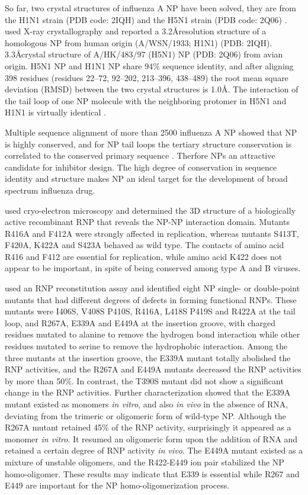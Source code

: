 So far, two crystal structures of influenza A NP have been solved, they are from the H1N1 strain (PDB code: 2IQH) \citep{1140} and the H5N1 strain (PDB code: 2Q06) \citep{1231}. \citep{1140} used X-ray crystallography and reported a 3.2\AA resolution structure of a homologous NP from human origin (A/WSN/1933; H1N1) (PDB: 2IQH). \citep{1231} 3.3\AA crystal structure of A/HK/483/97 (H5N1) NP (PDB: 2Q06) from avian origin. H5N1 NP and H1N1 NP share 94\% sequence identity, and after aligning 398 residues (residues 22–72, 92–202, 213–396, 438–489) the root mean square deviation (RMSD) between the two crystal structures is 1.0\AA \citep{1140}. The interaction of the tail loop of one NP molecule with the neighboring protomer in H5N1 and H1N1 is virtually identical \citep{1140}.

Multiple sequence alignment of more than 2500 influenza A NP showed that NP is highly conserved, and for NP tail loops the tertiary structure conservation is correlated to the conserved primary sequence \citep{1517}. Therfore NPs an attractive candidate for inhibitor design. The high degree of conservation in sequence identity and structure makes NP an ideal target for the development of broad spectrum influenza drug.%

\citep{1447} used cryo-electron microscopy and determined the 3D structure of a biologically active recombinant RNP that reveals the NP-NP interaction domain. Mutants R416A and F412A were strongly affected in replication, whereas mutants S413T, F420A, K422A and S423A behaved as wild type. The contacts of amino acid R416 and F412 are essential for replication, while amino acid K422 does not appear to be important, in spite of being conserved among type A and B viruses.

\citep{1232} used an RNP reconstitution assay and identified eight NP single- or double-point mutants that had different degrees of defects in forming functional RNPs. These mutants were I406S, V408S P410S, R416A, L418S P419S and R422A at the tail loop, and R267A, E339A and E449A at the insertion groove, with charged residues mutated to alanine to remove the hydrogen bond interaction while other residues mutated to serine to remove the hydrophobic interaction. Among the three mutants at the insertion groove, the E339A mutant totally abolished the RNP activities, and the R267A and E449A mutants decreased the RNP activities by more than 50\%. In contrast, the T390S mutant did not show a significant change in the RNP activities. Further characterization showed that the E339A mutant existed as monomers \textit{in vitro}, and also \textit{in vivo} in the absence of RNA, deviating from the trimeric or oligomeric form of wild-type NP. Although the R267A mutant retained 45\% of the RNP activity, surprisingly it appeared as a monomer \textit{in vitro}. It resumed an oligomeric form upon the addition of RNA and retained a certain degree of RNP activity \textit{in vivo}. The E449A mutant existed as a mixture of unstable oligomers, and the R422-E449 ion pair stabilized the NP homo-oligomer. These results may indicate that E339 is essential while R267 and E449 are important for the NP homo-oligomerization process.

